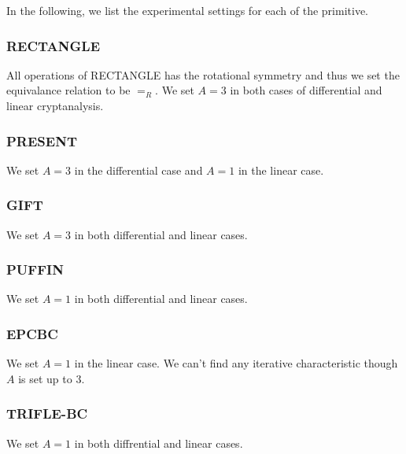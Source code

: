 In the following, we list the experimental settings for each of the primitive. 

\subsubsection{RECTANGLE} All operations of RECTANGLE has the rotational symmetry and thus we set the equivalance relation to be $=_R$. We set $A=3$ in both cases of differential and linear cryptanalysis. 

\subsubsection{PRESENT} We set $A=3$ in the differential case and $A=1$ in the linear case. 

\subsubsection{GIFT} We set $A=3$ in both differential and linear cases. 

\subsubsection{PUFFIN} We set $A=1$ in both differential and linear cases.

\subsubsection{EPCBC} We set $A=1$ in the linear case. We can't find any iterative characteristic though $A$ is set up to 3. 

\subsubsection{TRIFLE-BC} We set $A=1$ in both diffrential and linear cases. 



